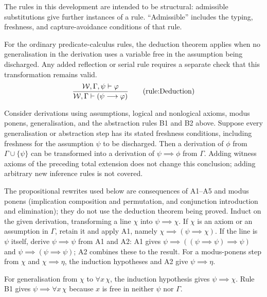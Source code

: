 \begin{note}
The rules in this development are intended to be structural: admissible
substitutions give further instances of a rule. ``Admissible'' includes the
typing, freshness, and capture-avoidance conditions of that rule.
\end{note}

\begin{inferencerule}[deduction]
For the ordinary predicate-calculus rules, the deduction theorem applies
when no generalisation in the derivation uses a variable free in the
assumption being discharged. Any added reflection or serial rule requires a
separate check that this transformation remains valid.
\[
\frac{
\Wau,\Gamma,\psi \vdash \phi
}{
\Wau,\Gamma \vdash (\psi\implies \phi)}
\labeltagd{rule}{Deduction}
\]
\end{inferencerule}

\begin{proposition}
\label{prop:local_deduction}
Consider derivations using assumptions, logical and nonlogical axioms,
modus ponens, generalisation, and the abstraction rules B1 and B2 above.
Suppose every generalisation or abstraction step has its stated freshness
conditions, including freshness for the assumption $\psi$ to be discharged.
Then a derivation of $\phi$ from $\Gamma\cup\{\psi\}$ can be transformed
into a derivation of $\psi\implies\phi$ from $\Gamma$. Adding witness
axioms of the preceding total extension does not change this conclusion;
adding arbitrary new inference rules is not covered.
\end{proposition}
\Proof
The propositional rewrites used below are consequences of A1--A5
and modus ponens (implication composition and permutation, and conjunction
introduction and elimination); they do not use the deduction theorem
being proved. Induct on the given derivation, transforming a line $\chi$ into
$\psi\implies\chi$. If $\chi$ is an axiom or an assumption in
$\Gamma$, retain it and apply A1, namely
$\chi\implies(\psi\implies\chi)$. If the line is $\psi$ itself,
derive $\psi\implies\psi$ from A1 and A2: A1 gives
$\psi\implies((\psi\implies\psi)\implies\psi)$ and
$\psi\implies(\psi\implies\psi)$; A2 combines these to the result.
For a modus-ponens step from $\chi$ and $\chi\implies\eta$, the
induction hypotheses and A2 give $\psi\implies\eta$.

For generalisation from $\chi$ to $\forall x\,\chi$, the induction
hypothesis gives $\psi\implies\chi$. Rule B1 gives
$\psi\implies\forall x\,\chi$ because $x$ is free in neither
$\psi$ nor $\Gamma$.

